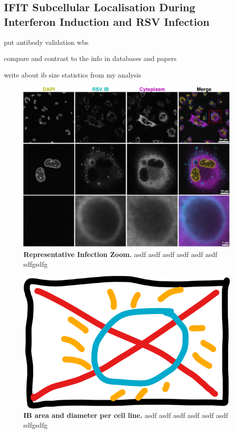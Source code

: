 \subsection{IFIT Subcellular Localisation During Interferon Induction and RSV Infection} \label{subsec:IFIT Subcellular Localisation During Interferon INduction and RSV Infection}
put antibody validation wbs

compare and contrast to the info in databases and papers

write about ib size statistics from my analysis


\begin{figure}
    \centering
    \includegraphics[width=1\linewidth]{09. Chapter 4/Figs/01. Localisation introduction/01. IB-zooms.pdf}
    \caption[Representative Infection Zoom.]{\textbf{Representative Infection Zoom.} asdf asdf asdf asdf asdf asdf sdfgsdfg}
    \label{fig:Representative Infection Zoom}
\end{figure}

\begin{figure}
    \centering
    \includegraphics[width=1\linewidth]{09. Chapter 4/Figs/01. Localisation introduction/02. placeholder - ib statistics.png}
    \caption[IB area and diameter per cell line.]{\textbf{IB area and diameter per cell line.} asdf asdf asdf asdf asdf asdf sdfgsdfg}
    \label{fig:IB area and diameter per cell line}
\end{figure}



